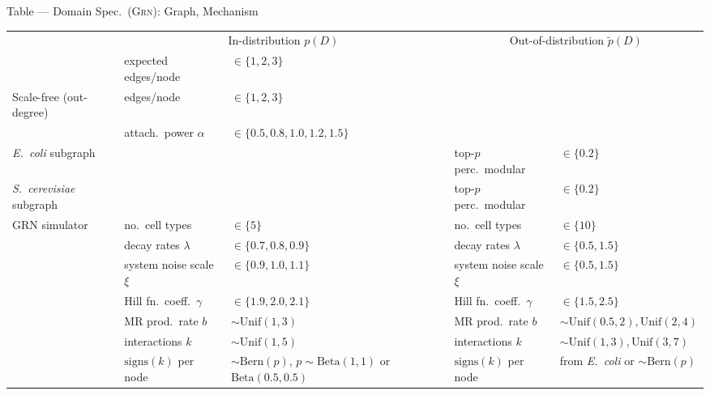 \documentclass[aspectratio=169,10pt]{beamer}
\newcommand{\domain}[1]{\textsc{#1}}
\newcommand{\grndomain}{\domain{Grn}\xspace}
\newcommand{\ecoli}{{\em E.\ coli}\xspace}
\newcommand{\yeast}{{\em S.\ cerevisiae}\xspace}
\newcommand\erdosrenyi{\text{Erd{\H{o}}s-R{\'e}nyi}\xspace}
\newcommand{\unif}{\text{Unif}}
\begin{document}
\begin{frame}{Table --- Domain Spec.\ (\grndomain): Graph, Mechanism}
\scriptsize
\begin{adjustbox}{max width=\textwidth}
\begin{tabular}{lllll}
\toprule
 & \multicolumn{2}{c}{In-distribution $p(D)$} & \multicolumn{2}{c}{Out-of-distribution $\tilde{p}(D)$} \\
\cmidrule{2-5}
\erdosrenyi & expected edges/node & $\in \{1, 2, 3\}$ &  & \\
Scale-free (out-degree) & edges/node & $\in \{1, 2, 3\}$ & & \\
 & attach.\ power $\alpha$  & $\in \{0.5, 0.8, 1.0, 1.2, 1.5\}$ & &  \\
\ecoli subgraph &&& top-$p$ perc.\ modular & $\in \{0.2\}$ \\
\yeast subgraph &&& top-$p$ perc.\ modular & $\in \{0.2\}$ \\
\midrule
GRN simulator & no.\ cell types & $\in \{5 \}$ & no.\ cell types & $\in \{ 10 \}$ \\
 & decay rates $\lambda$ & $\in \{0.7, 0.8, 0.9 \}$&  decay rates $\lambda$ & $\in \{0.5, 1.5\}$\\
& system noise scale $\xi$ & $\in \{0.9, 1.0, 1.1 \}$&  system noise scale $\xi$ & $\in \{0.5, 1.5\}$\\
& Hill fn.\ coeff.\ $\gamma$ & $\in \{1.9, 2.0, 2.1 \}$&  Hill fn.\ coeff.\ $\gamma$ & $\in \{1.5, 2.5 \}$\\
& MR prod.\ rate $b$ & $\sim \unif(1, 3)$ &  MR prod.\ rate $b$ & $\sim \unif(0.5, 2), \unif(2, 4)$  \\
& interactions $k$ & $\sim \unif(1, 5)$ &  interactions $k$ & $\sim \unif(1, 3), \unif(3, 7)$  \\
& $\text{signs}(k)$ per node & $\sim \text{Bern}(p)$, $p\sim\text{Beta}(1, 1)$ or $\text{Beta}(0.5, 0.5)$ &   $\text{signs}(k)$ per node & from \ecoli or $\sim \text{Bern}(p)$  \\
\bottomrule
\end{tabular}
\end{adjustbox}
\end{frame}
\end{document}
